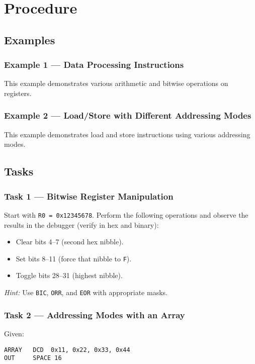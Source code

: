 \newpage
\section{Procedure}

\subsection{Examples}

\subsubsection{Example 1 --- Data Processing Instructions}
This example demonstrates various arithmetic and bitwise operations on registers.

\newpage
\subsubsection{Example 2 --- Load/Store with Different Addressing Modes}
This example demonstrates load and store instructions using various addressing modes.


\subsection{Tasks}
\subsubsection{Task 1 --- Bitwise Register Manipulation}
Start with \texttt{R0 = 0x12345678}. Perform the following operations and observe the results in the debugger (verify in hex and binary):
\begin{itemize}[nosep]
    \item Clear bits 4--7 (second hex nibble).
    \item Set bits 8--11 (force that nibble to \texttt{F}).
    \item Toggle bits 28--31 (highest nibble).
\end{itemize}
\emph{Hint:} Use \texttt{BIC}, \texttt{ORR}, and \texttt{EOR} with appropriate masks.  

\subsubsection{Task 2 --- Addressing Modes with an Array}
Given:
\begin{lstlisting}
ARRAY   DCD  0x11, 0x22, 0x33, 0x44
OUT     SPACE 16
\end{lstlisting}

